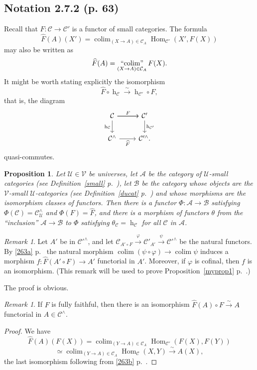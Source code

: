 \documentclass[12pt]{article}
\newtheorem{prop}[thm]{Proposition}
\theoremstyle{remark}
\newtheorem{rk}[thm]{Remark}
\theoremstyle{definition}
\newcommand{\cc}{\mathcal}
\newcommand{\A}{\mathcal A}
\newcommand{\B}{\mathcal B}
\newcommand{\C}{\mathcal C}
\newcommand{\U}{\mathcal U}
\newcommand{\V}{\mathcal V}
\newcommand{\pp}{\varphi}
\newcommand{\xr}{\xrightarrow}
\DeclareMathOperator*{\colim}{colim}
\DeclareMathOperator*{\icolim}{``\!\colim\!"}
\DeclareMathOperator{\hy}{h}
\DeclareMathOperator{\Hom}{Hom}
\begin{document}

\subsection{Notation 2.7.2 (p. 63)}

Recall that $F:\C\to\C'$ is a functor of small categories. The formula 
$$
\widehat F(A)(X')=\colim_{(X\to A)\in\C_A}\Hom_{\C'}(X',F(X))
$$
may also be written as 
$$
\widehat F(A)=\icolim_{(X\to A)\in\C_A}F(X).
$$
It might be worth stating explicitly the isomorphism 
$$
\widehat F\circ\hy_\C\xr\sim\hy_{\C'}\circ F, 
$$ 
that is, the diagram 
$$
\begin{tikzcd}
\C\ar{r}\ar{d}[swap]{\hy_\C}\ar{r}{F}&\C'\ar{d}{\hy_{\C'}}\\ 
\C^\wedge\ar{r}[swap]{\widehat F}&\C'^\wedge.
\end{tikzcd}
$$ 
quasi-commutes. 

\begin{prop}\label{yf} 
Let $\U\in\V$ be universes, let $\A$ be the category of $\U$-small categories (see Definition~\ref{small} p.~\pageref{small}), let $\B$ be the category whose objects are the $\V$-small $\U$-categories (see Definition~\ref{ducat} p.~\pageref{ducat}) and whose morphisms are the isomorphism classes of functors. Then there is a functor $\Phi:\A\to\B$ satisfying $\Phi(\C)=\C^\wedge_\U$ and $\Phi(F)=\widehat F$, and there is a morphism of functors $\theta$ from the ``inclusion'' $\A\to\B$ to $\Phi$ satisfying $\theta_\C=\hy_\C$ for all $\C$ in $\A$. 
\end{prop}

\begin{rk}\label{cof}
Let $A'$ be in $\cc C'^\wedge$, and let $\cc C_{A'\circ F}\xr\pp\cc C'_{A'}\xr\psi\C'^\wedge$ be the natural functors. By \eqref{263a} p.~\pageref{263a} the natural morphism $\colim(\psi\circ\pp)\to\colim\psi$ induces a morphism $f:\widehat F(A'\circ F)\to A'$ functorial in $A'$. Moreover, if $\pp$ is cofinal, then $f$ is an isomorphism. (This remark will be used to prove Proposition~\ref{myprop1} p.~\pageref{myprop1}.)
\end{rk}

The proof is obvious.

\begin{rk}
If $F$ is fully faithful, then there is an isomorphism $\widehat F(A)\circ F\xr\sim A$ functorial in $A\in\C^\wedge$.
\end{rk} 

\begin{proof}
We have 
$$
\widehat F(A)(F(X))=\colim_{(Y\to A)\in\C_A}\Hom_{\C'}(F(X),F(Y))
$$
$$
\simeq\colim_{(Y\to A)\in\C_A}\Hom_\C(X,Y)\xr\sim A(X),
$$
the last isomorphism following from \eqref{263b} p.~\pageref{263b}.
\end{proof}
\end{document}
